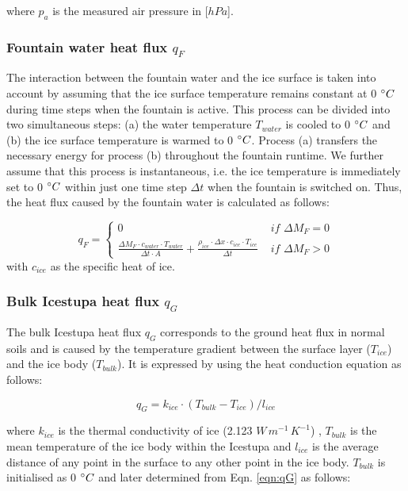 \documentclass[utf8]{frontiersSCNS} %
\begin{document}
where $p_{a}$ is the measured air pressure in [$hPa$].  

\subsubsection{Fountain water heat flux
\texorpdfstring{$q_{F}$}{Lg} }

The interaction between the fountain water and the ice surface is taken into account by assuming that the ice surface
temperature remains constant at 0 $\degree C$ during time steps when the fountain is active. This process can be divided
into two simultaneous steps: (a) the water temperature $T_{water}$ is cooled to 0 $\degree C$ and (b) the ice surface
temperature is warmed to 0 $\degree C$.  Process (a) transfers the necessary energy for process (b) throughout the
fountain runtime. We further assume that this process is instantaneous, i.e. the ice temperature is immediately set to 0
$\degree C$ within just one time step $\Delta t$ when the fountain is switched on. Thus, the heat flux caused by the
fountain water is calculated as follows:

\begin{equation} 
  q_{F} = \left\{ \begin{array}{ll}
         0 & \textit{ if } \Delta M_{F} = 0\\ \frac{ \Delta M_F \cdot c_{water} \cdot T_{water}}{\Delta t \cdot A} +
         \frac{\rho_{ice} \cdot \Delta x \cdot c_{ice} \cdot T_{ice}}{\Delta t} & \textit{ if } \Delta M_{F} > 0 
    \end{array} \right.  \label{eqn:qF}
\end{equation} 
with $c_{ice}$ as the specific heat of ice. 

\subsubsection{Bulk Icestupa heat flux \texorpdfstring{$q_{G}$}{Lg}} \label{sec:Bulkflux}
The bulk Icestupa heat flux $q_{G}$ corresponds to the ground heat flux in normal soils and is caused by the temperature
gradient between the surface layer ($T_{ice}$) and the ice body ($T_{bulk}$). It is expressed by using the heat
conduction equation as follows:

\begin{equation} q_{G} = k_{ice} \cdot (T_{bulk}-T_{ice})/l_{ice} \label{eqn:qG}    \end{equation}

where $k_{ice}$ is the thermal conductivity of ice (2.123 $W\, m^{-1}\,K^{-1}$) , $T_{bulk}$ is the mean temperature of
the ice body within the Icestupa and $l_{ice}$ is the average distance of any point in the surface to any other point in
the ice body. $T_{bulk}$ is initialised as 0 $\degree C$ and later determined from Eqn. \ref{eqn:qG} as follows:
\end{document}
